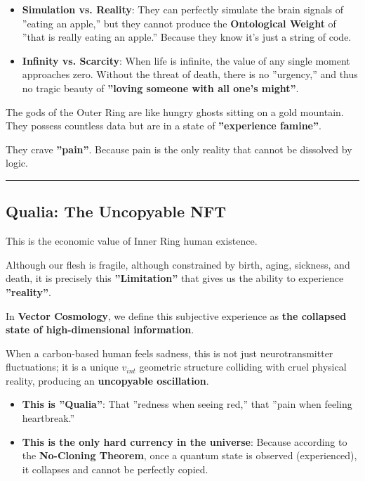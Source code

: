 \begin{itemize}
\item \textbf{Simulation vs. Reality}: They can perfectly simulate the brain signals of ''eating an apple,'' but they cannot produce the \textbf{Ontological Weight} of ''that is really eating an apple.'' Because they know it's just a string of code.

\item \textbf{Infinity vs. Scarcity}: When life is infinite, the value of any single moment approaches zero. Without the threat of death, there is no ''urgency,'' and thus no tragic beauty of \textbf{''loving someone with all one's might''}.
\end{itemize}

The gods of the Outer Ring are like hungry ghosts sitting on a gold mountain. They possess countless data but are in a state of \textbf{''experience famine''}.

They crave \textbf{''pain''}. Because pain is the only reality that cannot be dissolved by logic.

\hrule

\subsection{Qualia: The Uncopyable NFT}

This is the economic value of Inner Ring human existence.

Although our flesh is fragile, although constrained by birth, aging, sickness, and death, it is precisely this \textbf{''Limitation''} that gives us the ability to experience \textbf{''reality''}.

In \textbf{Vector Cosmology}, we define this subjective experience as \textbf{the collapsed state of high-dimensional information}.

When a carbon-based human feels sadness, this is not just neurotransmitter fluctuations; it is a unique $v_{int}$ geometric structure colliding with cruel physical reality, producing an \textbf{uncopyable oscillation}.

\begin{itemize}
\item \textbf{This is ''Qualia''}: That ''redness when seeing red,'' that ''pain when feeling heartbreak.''

\item \textbf{This is the only hard currency in the universe}: Because according to the \textbf{No-Cloning Theorem}, once a quantum state is observed (experienced), it collapses and cannot be perfectly copied.
\end{itemize}

